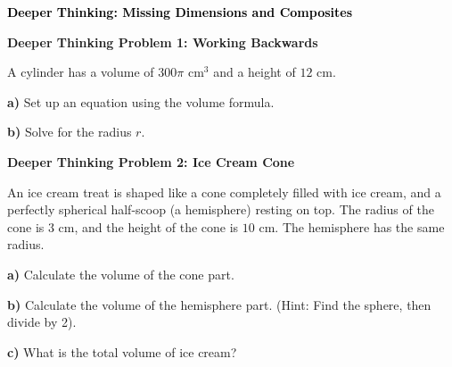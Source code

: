 \documentclass[12pt, letterpaper, fleqn]{article}
\begin{document}
\newpage

\begin{tcolorbox}[colback=customteal!20]
\large\textcolor{black}{\textbf{Deeper Thinking: Missing Dimensions and Composites}}
\end{tcolorbox}

\vspace{3mm}

\begin{tcolorbox}[colback=white!15, colframe=black, boxrule=1.5pt, arc=4mm, left=6mm, right=6mm, top=5mm, bottom=5mm]

\textbf{Deeper Thinking Problem 1: Working Backwards}

\medskip

\noindent
A cylinder has a volume of $300\pi\text{ cm}^3$ and a height of $12\text{ cm}$. 

\vspace{5mm}

\noindent
\textbf{a)} Set up an equation using the volume formula.

\vspace{2.5cm}

\noindent
\textbf{b)} Solve for the radius $r$.

\vspace{3cm}

\end{tcolorbox}

\vspace{4mm}

\begin{tcolorbox}[colback=white!15, colframe=black, boxrule=1.5pt, arc=4mm, left=6mm, right=6mm, top=5mm, bottom=5mm]

\textbf{Deeper Thinking Problem 2: Ice Cream Cone}

\medskip

\noindent
An ice cream treat is shaped like a cone completely filled with ice cream, and a perfectly spherical half-scoop (a hemisphere) resting on top. The radius of the cone is $3\text{ cm}$, and the height of the cone is $10\text{ cm}$. The hemisphere has the same radius.

\vspace{5mm}

\noindent
\textbf{a)} Calculate the volume of the cone part.

\vspace{2cm}

\noindent
\textbf{b)} Calculate the volume of the hemisphere part. (Hint: Find the sphere, then divide by 2).

\vspace{2cm}

\noindent
\textbf{c)} What is the total volume of ice cream?

\vspace{1.5cm}

\end{tcolorbox}
\end{document}
